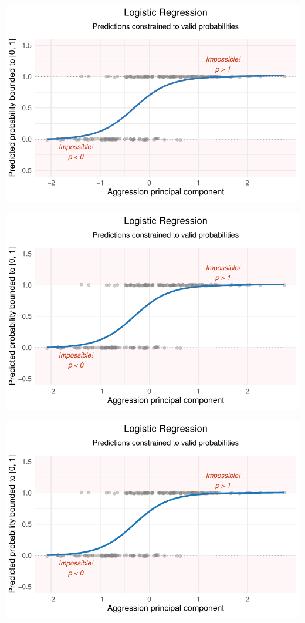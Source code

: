 \documentclass[
  letterpaper,
  DIV=11,
  numbers=noendperiod]{scrartcl}
\begin{document}
\begin{center}
\includegraphics[width=0.8\linewidth,height=\textheight,keepaspectratio]{Beyond!!!_files/figure-pdf/unnamed-chunk-4-45.pdf}
\end{center}

\begin{center}
\includegraphics[width=0.8\linewidth,height=\textheight,keepaspectratio]{Beyond!!!_files/figure-pdf/unnamed-chunk-4-46.pdf}
\end{center}

\begin{center}
\includegraphics[width=0.8\linewidth,height=\textheight,keepaspectratio]{Beyond!!!_files/figure-pdf/unnamed-chunk-4-47.pdf}
\end{center}
\end{document}
